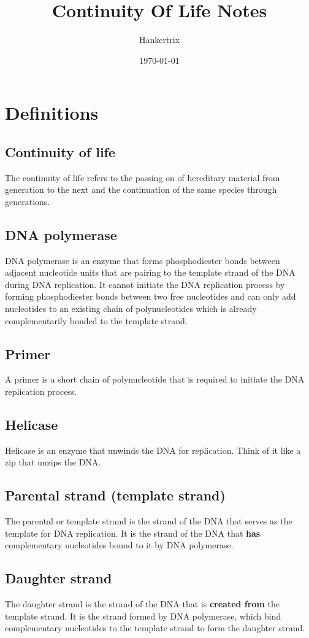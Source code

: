 \documentclass[11pt]{article}
\author{Hankertrix}
\date{\today}
\title{Continuity Of Life Notes}
\begin{document}
\maketitle
\setcounter{tocdepth}{2}
\tableofcontents \clearpage\newpage
\section{Definitions}
\label{sec:org5eac63e}

\subsection{Continuity of life}
\label{sec:orgdd4e837}
The continuity of life refers to the passing on of hereditary material from generation to the next and the continuation of the same species through generations.
\subsection{DNA polymerase}
\label{sec:orgd429f84}
DNA polymerase is an enzyme that forms phosphodiester bonds between adjacent nucleotide units that are pairing to the template strand of the DNA during DNA replication. It cannot initiate the DNA replication process by forming phosphodiester bonds between two free nucleotides and can only add nucleotides to an existing chain of polynucleotides which is already complementarily bonded to the template strand.
\subsection{Primer}
\label{sec:org9d5206c}
A primer is a short chain of polynucleotide that is required to initiate the DNA replication process.
\subsection{Helicase}
\label{sec:org1033efb}
Helicase is an enzyme that unwinds the DNA for replication. Think of it like a zip that unzips the DNA.
\subsection{Parental strand (template strand)}
\label{sec:orge9368c5}
The parental or template strand is the strand of the DNA that serves as the template for DNA replication. It is the strand of the DNA that \textbf{has} complementary nucleotides bound to it by DNA polymerase.
\subsection{Daughter strand}
\label{sec:org42794bc}
The daughter strand is the strand of the DNA that is \textbf{created from} the template strand. It is the strand formed by DNA polymerase, which bind complementary nucleotides to the template strand to form the daughter strand.
\end{document}
